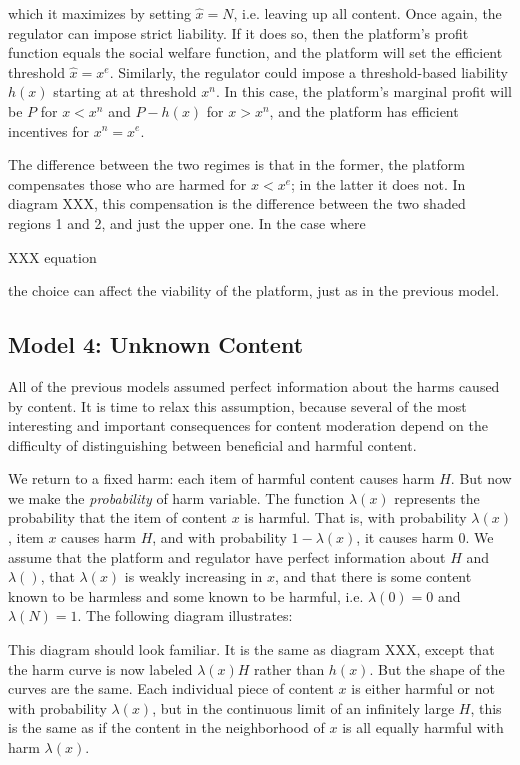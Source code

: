 which it maximizes by setting $\hat{x} = N$, i.e. leaving up all content. Once again, the regulator can impose strict liability. If it does so, then the platform's profit function equals the social welfare function, and the platform will set the efficient threshold $\hat{x} = x^e$. Similarly, the regulator could impose a threshold-based liability $h(x)$ starting at at threshold $x^n$. In this case, the platform's marginal profit will be $P$ for $x < x^n$ and $P - h(x)$ for $x > x^n$, and the platform has efficient incentives for $x^n = x^e$. 

The difference between the two regimes is that in the former, the platform compensates those who are harmed for $x < x^e$; in the latter it does not. In diagram XXX, this compensation is the difference between the two shaded regions 1 and 2, and just the upper one. In the case where

XXX equation

the choice can affect the viability of the platform, just as in the previous model.

\subsection{Model 4: Unknown Content}

All of the previous models assumed perfect information about the harms caused by content. It is time to relax this assumption, because several of the most interesting and important consequences for content moderation depend on the difficulty of distinguishing between beneficial and harmful content.

We return to a fixed harm: each item of harmful content causes harm $H$. But now we make the \emph{probability} of harm variable. The function $\lambda(x)$ represents the probability that the item of content $x$ is harmful. That is, with probability $\lambda(x)$, item $x$ causes harm $H$, and with probability $1 - \lambda(x)$, it causes harm $0$. We assume that the platform and regulator have perfect information about $H$ and $\lambda()$, that $\lambda(x)$ is weakly increasing in $x$, and that there is some content known to be harmless and some known to be harmful, i.e. $\lambda(0) = 0$ and $\lambda(N) = 1$. The following diagram illustrates:


This diagram should look familiar. It is the same as diagram XXX, except that the harm curve is now labeled $\lambda(x)H$ rather than $h(x)$. But the shape of the curves are the same. Each individual piece of content $x$ is either harmful or not with probability $\lambda(x)$, but in the continuous limit of an infinitely large $H$, this is the same as if the content in the neighborhood of $x$ is all equally harmful with harm $\lambda(x)$.

